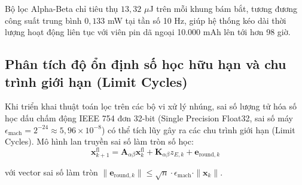 Bộ lọc Alpha-Beta chỉ tiêu thụ $13{,}32$ $\mu$J trên mỗi khung bám bắt, tương đương công suất trung bình $0{,}133$ mW tại tần số 10 Hz, giúp hệ thống kéo dài thời lượng hoạt động liên tục với viên pin dã ngoại 10.000 mAh lên tới hơn 98 giờ.

\subsection{Phân tích độ ổn định số học hữu hạn và chu trình giới hạn (Limit Cycles)}

\hspace{0.5cm} Khi triển khai thuật toán lọc trên các bộ vi xử lý nhúng, sai số lượng tử hóa số học dấu chấm động IEEE 754 đơn 32-bit (Single Precision Float32, sai số máy $\epsilon_{\text{mach}} = 2^{-24} \approx 5{,}96 \times 10^{-8}$) có thể tích lũy gây ra các chu trình giới hạn (Limit Cycles). Mô hình lan truyền sai số làm tròn số học:
\begin{equation}
\mathbf{x}_{k+1}^{\text{fl}} = \mathbf{A}_{\alpha\beta} \mathbf{x}_k^{\text{fl}} + \mathbf{K}_{\alpha\beta} z_{E,k} + \mathbf{e}_{\text{round}, k}
\label{eq:finite-word-length-error-propagation}
\end{equation}

với vector sai số làm tròn $\|\mathbf{e}_{\text{round}, k}\| \le \sqrt{n} \cdot \epsilon_{\text{mach}} \cdot \|\mathbf{x}_k\|$.

\begin{table}[H]
\centering
\caption{Khảo sát sự tích lũy sai số làm tròn số học sau $100.000$ khung đo lường liên tục ($2{,}77$ giờ)}
\label{tab:float32-vs-float64-precision-sweep}
\end{table}

